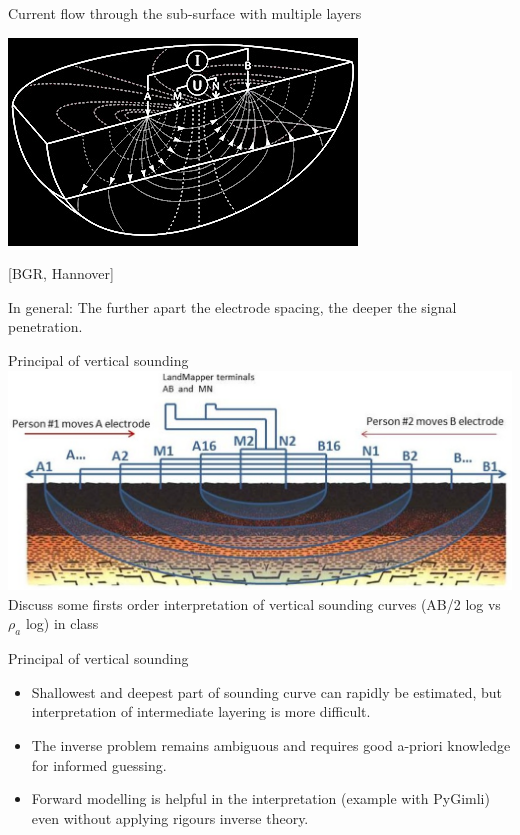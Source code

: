 \begin{frame}{Current flow through the sub-surface with multiple layers}
  \begin{center}
        \includegraphics[width=0.5\linewidth]{Figures/Resistivity/SchlumbergerSounding_BGR.jpg}

        \tiny [BGR, Hannover]

        \small In general: The further apart the electrode spacing, the deeper the signal penetration.

\end{center}
\end{frame}

\begin{frame}{Principal of vertical sounding}
  \includegraphics[width=0.9\linewidth]{Figures/Resistivity/VerticalSounding_GeoscienceEG.png}
   \small \alert{Discuss some firsts order interpretation of vertical sounding curves (AB/2 log vs $\rho_a$ log) in class}
\end{frame}

\begin{frame}
  \begin{PointSix}{Principal of vertical sounding}
    \small
    \begin{itemize}
      \item Shallowest and deepest part of sounding curve can rapidly be estimated, but interpretation of intermediate layering is more difficult.
      \item The inverse problem remains ambiguous and requires good a-priori knowledge for informed guessing.
      \item Forward modelling is helpful in the interpretation (example with PyGimli) even without applying rigours inverse theory.
  \end{itemize}
\end{PointSix}
\end{frame}

